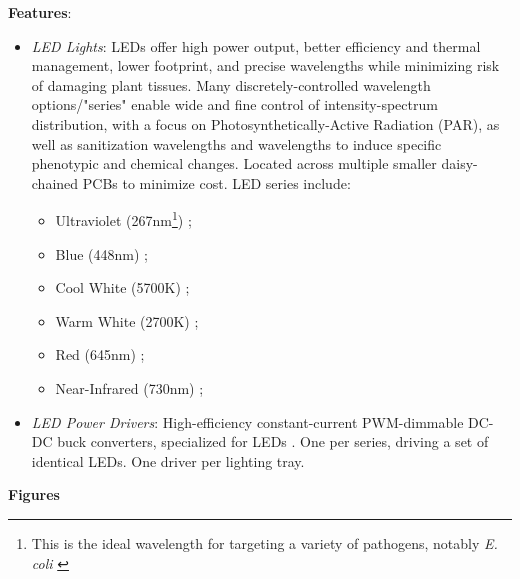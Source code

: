 \textbf{Features}:
\begin{itemize}
    \item \textit{LED Lights}: LEDs offer high power output, better efficiency and thermal management, lower footprint, and precise wavelengths while minimizing risk of damaging plant tissues. Many discretely-controlled wavelength options/"series" enable wide and fine control of intensity-spectrum distribution, with a focus on Photosynthetically-Active Radiation (PAR), as well as sanitization wavelengths and wavelengths to induce specific phenotypic and chemical changes. Located across multiple smaller daisy-chained PCBs to minimize cost. LED series include:
    \begin{itemize}
        \item Ultraviolet (267nm\footnote{This is the ideal wavelength for targeting a variety of pathogens, notably \textit{E. coli} \cite{uvecoli}}) \cite{led_uv};
        \item Blue (448nm) \cite{led_xpg3};
        \item Cool White (5700K) \cite{led_xpg3};
        \item Warm White (2700K) \cite{led_xpg3};
        \item Red (645nm) \cite{led_xpg3};
        \item Near-Infrared (730nm) \cite{led_xpe2};
    \end{itemize}
    \item \textit{LED Power Drivers}: High-efficiency constant-current PWM-dimmable DC-DC buck converters, specialized for LEDs \cite{leddriver}. One per series, driving a set of identical LEDs. One driver per lighting tray.
\end{itemize}

\clearpage

\textbf{Figures}

